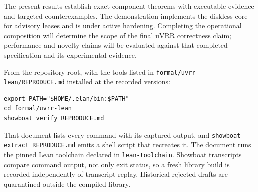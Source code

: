 \documentclass[10pt,journal,letterpaper]{IEEEtran}
\newcommand{\code}[1]{\texttt{\small #1}}
\begin{document}
The present results establish exact component theorems with executable
evidence and targeted counterexamples. The demonstration implements the
diskless core for advisory leases and is under active hardening. Completing
the operational composition will determine the scope of the final uVRR
correctness claim; performance and novelty claims will be evaluated against
that completed specification and its experimental evidence.

From the repository root, with the tools listed in
\code{formal/uvrr-lean/REPRODUCE.md} installed at the recorded versions:
\begin{verbatim}
export PATH="$HOME/.elan/bin:$PATH"
cd formal/uvrr-lean
showboat verify REPRODUCE.md
\end{verbatim}
That document lists every command with its captured output, and
\code{showboat extract REPRODUCE.md} emits a shell script that recreates it.
The document runs the pinned Lean toolchain declared in
\code{lean-toolchain}. Showboat transcripts compare command output, not only
exit status, so a fresh library build is recorded independently of transcript
replay. Historical rejected drafts are quarantined outside the compiled
library.
\end{document}
